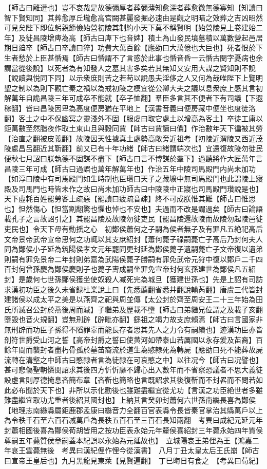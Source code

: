 【師古曰離遭也】豈不哀哉是故德彌厚者葬彌薄知愈深者葬愈微無德寡知【知讀曰智下賢知同】其葬愈厚丘壠愈高宫闕甚麗發掘必速由是觀之明暗之效葬之吉凶昭然可見矣陛下即位躬親節儉始營初陵其制約小天下莫不稱賢明【始營陵見上卷建始二年】及徙昌陵增庳為高【師古曰庳下也音婢】積土為山發民墳墓積以萬數營起邑居期日廹卒【師古曰卒讀曰猝】功費大萬百餘【應劭曰大萬億也大巨也】死者恨於下生者愁於上臣甚惛焉【師古曰惛謂不了言惑於此事也惛音昏一云惛古閔字憂病也余謂當從後說】以死者為有知發人之墓其害多矣若其無知又安用大謀之賢知則不說【說讀與悦同下同】以示衆庶則苦之若苟以說愚夫淫侈之人又何為哉唯陛下上覽明聖之制以為則下觀亡秦之禍以為戒初陵之模宜從公卿大夫之議以息衆庶上感其言初解萬年自詭昌陵三年可成卒不能就【卒子恤翻】羣臣多言其不便者下有司議【下遐稼翻】皆曰昌陵因卑為高度便房猶在平地上【漢書音義曰便房藏中便坐也度徒洛翻】客土之中不保幽冥之靈淺外不固【服䖍曰取它處土以增高為客土】卒徒工庸以鉅萬數至然脂夜作取土東山且與穀同賈【師古曰賈讀曰價】作治數年天下徧被其勞【治直之翻被皮義翻】故陵因天性㨿真土處勢高敞旁近祖考【初陵近渭陵又西近茂陵處昌呂翻近其靳翻】前又已有十年功緒【師古曰緒謂端次也】宜還復故陵勿徙民便秋七月詔曰朕執德不固謀不盡下【師古曰言不博謀於羣下】過聽將作大匠萬年言昌陵三年可成【師古曰過誤也萬年解萬年也】作治五年中陵司馬殿門内尚未加功【如淳曰陵中有司馬殿門如生時制也臣瓚曰天子之藏壙中無司馬殿門也此謂陵上寢殿及司馬門也時皆未作之故曰尚未加功師古曰中陵陵中正寢也司馬殿門瓚說是也】天下虛耗百姓罷勞客土疏惡【罷讀曰疲疏音疎】終不可成朕惟其難【師古曰惟思也】怛然傷心【怛當割翻驚也懼也悼也不安也】夫過而不改是謂過矣【師古曰論語載孔子之言故詔引之】其罷昌陵及故陵勿徙吏民【罷昌陵還故陵而故陵勿起陵邑徙吏民也】令天下毋有動揺之心　初鄼侯蕭何之子嗣為侯者無子及有罪凡五絶祀高后文帝景帝武帝宣帝思何之功輒以其支庶紹封【蕭何薨子祿嗣薨亡子高后乃封何夫人同為鄼侯小子延為筑陽侯孝文元年罷同更封延為鄼侯薨子遺嗣薨亡子文帝復以遺弟則嗣有罪免景帝二年封則弟嘉為武陽侯薨子勝嗣有罪免武帝元狩中復以鄼戶二千四百封何曾孫慶為鄼侯慶則子也薨子夀成嗣坐罪免宣帝封何玄孫建世為鄼侯凡五紹封】是歲何七世孫鄼侯獲坐使奴殺人减死完為城旦【獲建世孫也】先是上詔有司訪求漢初功臣之後久未省録杜業說上曰【先悉薦翻省悉井翻說輸芮翻】唐虞三代皆封建諸侯以成太平之美是以燕齊之祀與周並傳【太公封於齊至周安王二十三年始為田氏所滅召公封於燕後周而滅】子繼弟及歷載不墮【師古曰弟繼兄位謂之及載子亥翻墮毁也音火規翻】豈無刑辟【辟毗亦翻】繇祖之竭力故支庶賴焉【師古曰言國家非無刑辟而功臣子孫得不䧟罪辜而能長存者思其先人之力令有嗣續也】迹漢功臣亦皆剖符世爵受山河之誓【高帝封爵之誓曰使黄河如帶泰山若厲國以永存爰及苖裔】百餘年間而襲封者盡朽骨孤於墓苖裔流於道生為愍隸死為轉屍【應劭曰死不能葬故屍流轉在溝壑之中師古曰愍隸者言為徒隸在可哀愍之中】以往况今【師古曰况譬也】甚可悲傷聖朝憐閔詔求其後四方忻忻靡不歸心出入數年而不省察恐議者不思大義徒設虛言則厚德掩息吝簡布章【吝靳也簡略也言既詔求其後復靳而不封畧而不問若如此必布聞於天下也】非所以示化勸後也雖難盡繼宜從尤功【言漢之功臣絶世者多雖難盡繼宜取功尤重者後紹其國封也】上納其言癸卯封蕭何六世孫南䜌長喜為鄼侯【地理志南䜌縣屬鉅鹿郡孟康曰䜌音力全翻百官表縣令長皆秦官掌治其縣萬戶以上為令秩千石至六百石减萬戶為長秩五百石至三百石長知兩翻　考異曰成紀元延元年封蕭相國後喜為鄼侯荀胡皆用之按功臣表永始元年釐侯喜紹封三年薨永始四年質侯尊嗣五年薨質侯章嗣蓋本紀誤以永始為元延故也】　立城陽哀王弟俚為王【鴻嘉二年哀王雲薨無後　考異曰漢紀俚作悝今從漢書】　八月丁丑太皇太后王氏崩【師古曰宣帝王皇后也】九月黑龍見東萊【見賢遍翻】　丁巳晦日有食之　【考異曰荀紀】


